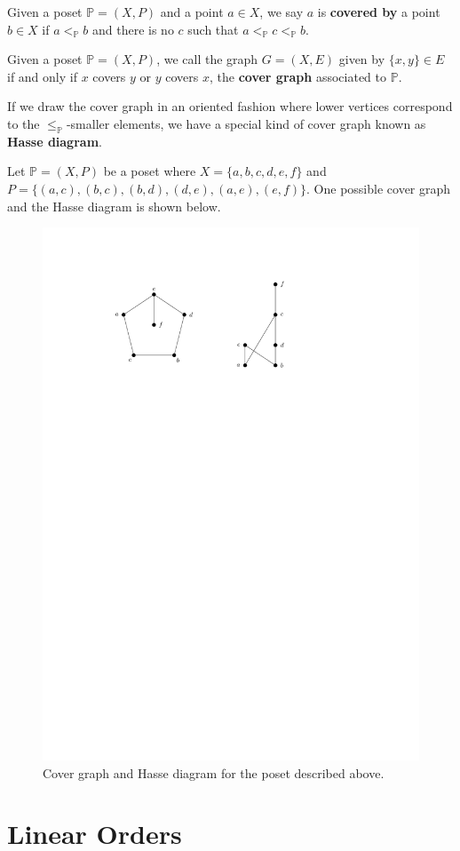 \begin{definition}[Cover]
    Given a poset $\mathbb{P} = (X,P)$ and a point $a \in X$, we say $a$ is \textbf{covered by} a point $b \in X$ if $a <_{\mathbb{P}} b$ and there is no $c$ such that $a <_{\mathbb{P}} c <_{\mathbb{P}} b$.
\end{definition}

\begin{definition}
    Given a poset $\mathbb{P} = (X,P)$, we call the graph $G = (X,E)$ given by $\{x,y\} \in E$ if and only if $x$ covers $y$ or $y$ covers $x$, the \textbf{cover graph} associated to $\mathbb{P}$. 
\end{definition}

If we draw the cover graph in an oriented fashion where lower vertices correspond to the $\leq_{\mathbb{P}}$-smaller elements, we have a special kind of cover graph known as \textbf{Hasse diagram}.

Let $\mathbb{P} = (X,P)$ be a poset where $X = \{a,b,c,d,e,f\}$ and $P = \{ (a,c), (b,c), (b,d), (d,e), (a,e), (e,f)\}$. One possible cover graph and the Hasse diagram is shown below.

\begin{figure}[htbp]
    \centering
    \includegraphics[width=0.5\linewidth]{figures/hasse-diagram.pdf}
    \caption{Cover graph and Hasse diagram for the poset described above.}
    \label{fig:hasse-diagram-example}
\end{figure}

\section{Linear Orders}

